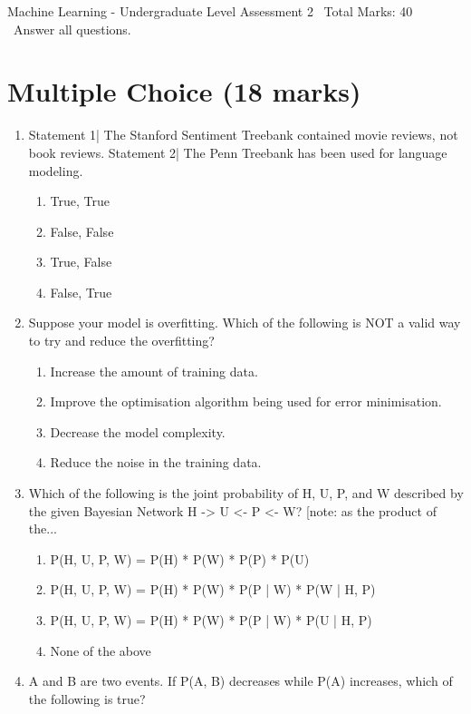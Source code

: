 \documentclass[12pt]{article}
\begin{document}
\begin{center}
Machine Learning - Undergraduate Level Assessment 2 \
Total Marks: 40 \
Answer all questions.
\end{center}

\section*{Multiple Choice (18 marks)}
\begin{enumerate}[label=\arabic*.]
\item Statement 1| The Stanford Sentiment Treebank contained movie reviews, not book reviews. Statement 2| The Penn Treebank has been used for language modeling.
\begin{enumerate}[label=(\alph*)]
    \item True, True
    \item False, False
    \item True, False
    \item False, True
\end{enumerate}
\item Suppose your model is overfitting. Which of the following is NOT a valid way to try and reduce the overfitting?
\begin{enumerate}[label=(\alph*)]
    \item Increase the amount of training data.
    \item Improve the optimisation algorithm being used for error minimisation.
    \item Decrease the model complexity.
    \item Reduce the noise in the training data.
\end{enumerate}
\item Which of the following is the joint probability of H, U, P, and W described by the given Bayesian Network H -\textgreater{} U \textless{}- P \textless{}- W? [note: as the product of the...
\begin{enumerate}[label=(\alph*)]
    \item P(H, U, P, W) = P(H) * P(W) * P(P) * P(U)
    \item P(H, U, P, W) = P(H) * P(W) * P(P | W) * P(W | H, P)
    \item P(H, U, P, W) = P(H) * P(W) * P(P | W) * P(U | H, P)
    \item None of the above
\end{enumerate}
\item A and B are two events. If P(A, B) decreases while P(A) increases, which of the following is true?

\end{enumerate}
\end{document}
